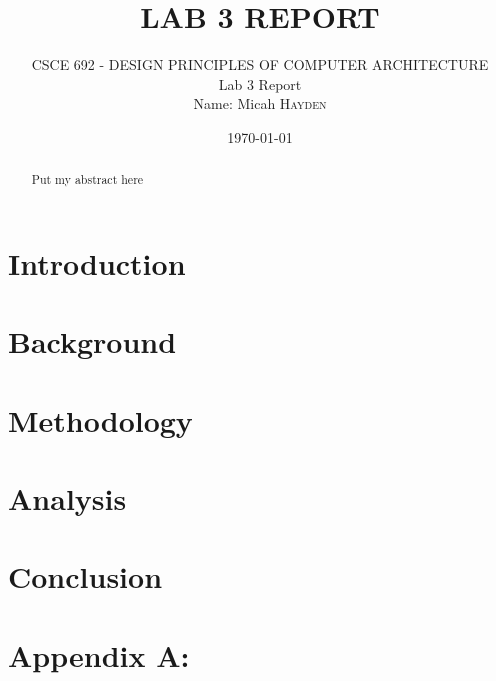 \documentclass{article}
\title{LAB 3 REPORT}
\author{CSCE 692 - DESIGN PRINCIPLES OF COMPUTER ARCHITECTURE \\ Lab 3 Report \\ Name:  Micah \textsc{Hayden}  }
\date{\today}
\begin{document}
\begin{titlingpage}
    \maketitle
    \begin{abstract}
        Put my abstract here
    \end{abstract}
\end{titlingpage}

\section{Introduction}
\cite{Hennessy:2017:CAS:3207796}


\section{Background}

\section{Methodology}

\section{Analysis}

\section{Conclusion}

\printbibliography

\newpage

\section*{Appendix A:  }
\end{document}
